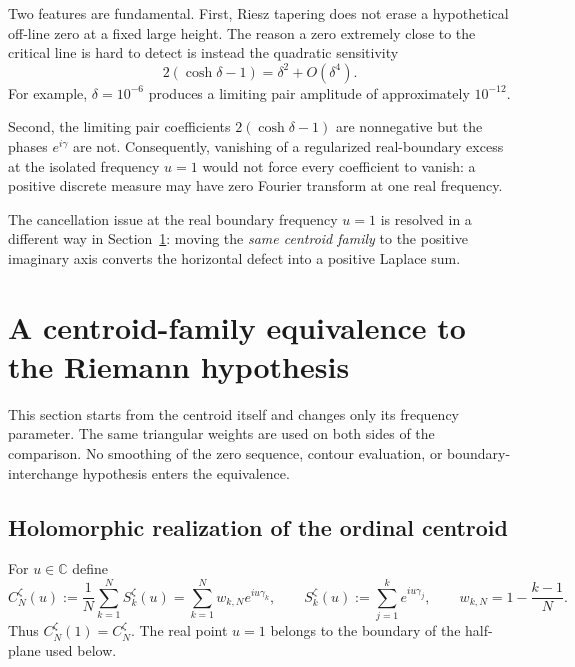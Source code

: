 \documentclass[11pt]{amsart}
\numberwithin{equation}{section}
\theoremstyle{definition}
\theoremstyle{remark}
\begin{document}
Two features are fundamental. First, Riesz tapering does not erase a hypothetical off-line zero at a fixed large height. The reason a zero extremely close to the critical line is hard to detect is instead the quadratic sensitivity
\begin{equation}\label{eq:quadraticdefect}
2(\cosh\delta-1)=\delta^2+O(\delta^4).
\end{equation}
For example, $\delta=10^{-6}$ produces a limiting pair amplitude of approximately $10^{-12}$.

Second, the limiting pair coefficients $2(\cosh\delta-1)$ are nonnegative but the phases $e^{i\gamma}$ are not. Consequently, vanishing of a regularized real-boundary excess at the isolated frequency $u=1$ would not force every coefficient to vanish: a positive discrete measure may have zero Fourier transform at one real frequency.

The cancellation issue at the real boundary frequency $u=1$ is resolved in a different way in Section~\ref{sec:rh_equivalence}: moving the \emph{same centroid family} to the positive imaginary axis converts the horizontal defect into a positive Laplace sum.



\section{A centroid-family equivalence to the Riemann hypothesis}\label{sec:rh_equivalence}

This section starts from the centroid itself and changes only its frequency parameter. The same triangular weights are used on both sides of the comparison. No smoothing of the zero sequence, contour evaluation, or boundary-interchange hypothesis enters the equivalence.

\subsection{Holomorphic realization of the ordinal centroid}\label{subsec:holomorphic_centroid_family}
For $u\in\mathbb C$ define
\begin{equation}\label{eq:centroid_frequency_family}
C_N^{\zeta}(u)
:=\frac1N\sum_{k=1}^{N}S_k^{\zeta}(u)
=\sum_{k=1}^{N}w_{k,N}e^{iu\gamma_k},
\qquad
S_k^{\zeta}(u):=\sum_{j=1}^{k}e^{iu\gamma_j},
\qquad
w_{k,N}=1-\frac{k-1}{N}.
\end{equation}
Thus $C_N^{\zeta}(1)=C_N^{\zeta}$. The real point $u=1$ belongs to the boundary of the half-plane used below.
\end{document}
